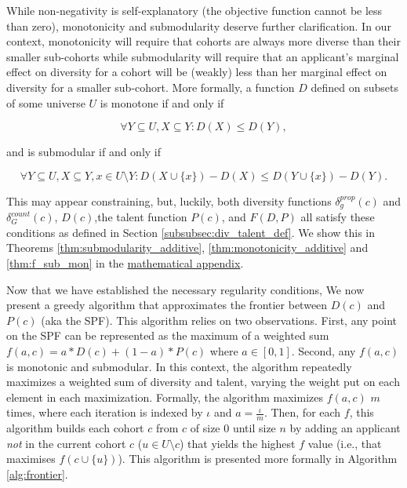 While non-negativity is self-explanatory (the objective function cannot be less than zero), monotonicity and submodularity deserve further clarification. In our context, monotonicity will require that cohorts are always more diverse than their smaller sub-cohorts while submodularity will require that an applicant's marginal effect on diversity for a cohort will be (weakly) less than her marginal effect on diversity for a smaller sub-cohort. More formally, a function $D$ defined on subsets of some universe $U$ is monotone if and only if 

\begin{equation}
    \label{eq:mononicity}
    \forall Y \subseteq U, X \subseteq Y: D(X)\leq D(Y),
\end{equation}

\noindent and is submodular if and only if

\begin{equation}
    \label{eq:submodularity}
    \forall Y \subseteq U, X \subseteq Y, x \in U \setminus Y: D(X \cup \{x\}) - D(X) \leq D(Y \cup \{x\}) - D(Y).
\end{equation}

This may appear constraining, but, luckily, both diversity functions $\delta_g^{prop}(c)$ and $\delta_G^{count}(c)$, $D(c)$,the talent function $P(c)$, and $F(D,P)$ all satisfy these conditions as defined in Section \ref{subsubsec:div_talent_def}. We show this in Theorems \ref{thm:submodularity_additive}, \ref{thm:monotonicity_additive} and \ref{thm:f_sub_mon} in the \hyperref[sec:math_appendix]{mathematical appendix}.

Now that we have established the necessary regularity conditions, We now present a greedy algorithm that approximates the frontier between $D(c)$ and $P(c)$ (aka the SPF). This algorithm relies on two observations. First, any point on the SPF can be represented as the maximum of a weighted sum $f(a,c) = a*D(c) + (1-a)*P(c)$ where $a \in [0,1]$. Second, any $f(a,c)$ is monotonic and submodular. In this context, the algorithm repeatedly maximizes a weighted sum of diversity and talent, varying  the weight put on each element in each maximization. Formally, the algorithm maximizes $f(a,c)$ $m$ times, where each iteration is indexed by $\iota$ and $a=\frac{\iota}{m}$. Then, for each $f$, this algorithm builds each cohort $c$ from $c$ of size $0$ until size $n$ by adding an applicant \textit{not} in the current cohort $c$ ($u \in U \setminus c$) that yields the highest $f$ value (i.e., that maximises $f(c \cup \{u\})$). This algorithm is presented more formally in Algorithm \ref{alg:frontier}. 

